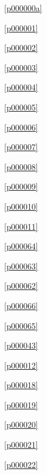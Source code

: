 ﻿



\noindent\figurename\ \ref{p000000a}\dotfill\pageref{p000000a}

\noindent\figurename\ \ref{p000001}\dotfill\pageref{p000001}

\noindent\figurename\ \ref{p000002}\dotfill\pageref{p000002}

\noindent\figurename\ \ref{p000003}\dotfill\pageref{p000003}

\noindent\figurename\ \ref{p000004}\dotfill\pageref{p000004}

\noindent\figurename\ \ref{p000005}\dotfill\pageref{p000005}

\noindent\figurename\ \ref{p000006}\dotfill\pageref{p000006}

\noindent\figurename\ \ref{p000007}\dotfill\pageref{p000007}

\noindent\figurename\ \ref{p000008}\dotfill\pageref{p000008}

\noindent\figurename\ \ref{p000009}\dotfill\pageref{p000009}

\noindent\figurename\ \ref{p000010}\dotfill\pageref{p000010}

\noindent\figurename\ \ref{p000011}\dotfill\pageref{p000011}

\noindent\figurename\ \ref{p000064}\dotfill\pageref{p000064}

\noindent\figurename\ \ref{p000063}\dotfill\pageref{p000063}

\noindent\figurename\ \ref{p000062}\dotfill\pageref{p000062}

\noindent\figurename\ \ref{p000066}\dotfill\pageref{p000066}

\noindent\figurename\ \ref{p000065}\dotfill\pageref{p000065}

\noindent\figurename\ \ref{p000043}\dotfill\pageref{p000043}

\noindent\figurename\ \ref{p000012}\dotfill\pageref{p000012}

\noindent\figurename\ \ref{p000018}\dotfill\pageref{p000018}

\noindent\figurename\ \ref{p000019}\dotfill\pageref{p000019}

\noindent\figurename\ \ref{p000020}\dotfill\pageref{p000020}

\noindent\figurename\ \ref{p000021}\dotfill\pageref{p000021}

\noindent\figurename\ \ref{p000022}\dotfill\pageref{p000022}

